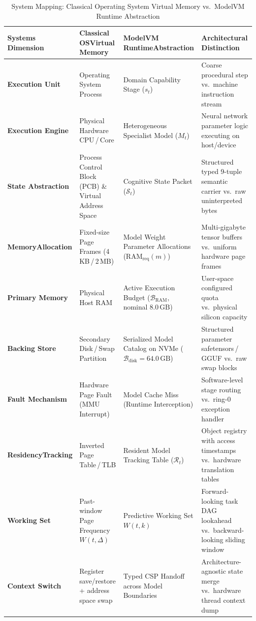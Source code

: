 \begin{table}[t]
\small
\centering
\caption{System Mapping: Classical Operating System Virtual Memory vs.\ ModelVM Runtime Abstraction}
\label{tab:os_analogy}
\setlength{\tabcolsep}{4pt}
\renewcommand{\arraystretch}{1.18}
\begin{tabular}{>{\RaggedRight\bfseries}p{2.85cm} >{\RaggedRight}p{3.55cm} >{\RaggedRight}p{3.78cm} >{\RaggedRight}p{5.20cm}}
\toprule
\textbf{Systems Dimension} & \textbf{Classical OS}\newline\textbf{Virtual Memory} & \textbf{ModelVM Runtime}\newline\textbf{Abstraction} & \textbf{Architectural Distinction} \\
\midrule
Execution Unit & Operating System Process & Domain Capability Stage ($s_t$) & Coarse procedural step vs.\ machine instruction stream \\
\addlinespace[3.5pt]
Execution Engine & Physical Hardware CPU\,/\,Core & Heterogeneous Specialist Model ($M_t$) & Neural network parameter logic executing on host/device \\
\addlinespace[3.5pt]
State Abstraction & Process Control Block (PCB) \& Virtual Address Space & Cognitive State Packet ($\mathcal{S}_t$) & Structured typed 9-tuple semantic carrier vs.\ raw uninterpreted bytes \\
\addlinespace[3.5pt]
Memory\newline Allocation & Fixed-size Page Frames (4\,KB\,/\,2\,MB) & Model Weight Parameter Allocations ($\text{RAM}_{\text{req}}(m)$) & Multi-gigabyte tensor buffers vs.\ uniform hardware page frames \\
\addlinespace[3.5pt]
Primary Memory & Physical Host RAM & Active Execution Budget ($\mathcal{B}_{\text{RAM}}$, nominal $8.0\,\text{GB}$) & User-space configured quota vs.\ physical silicon capacity \\
\addlinespace[3.5pt]
Backing Store & Secondary Disk\,/\,Swap Partition & Serialized Model Catalog on NVMe ($\mathcal{B}_{\text{disk}} = 64.0\,\text{GB}$) & Structured parameter \mbox{safetensors\,/\,GGUF} vs.\ raw swap blocks \\
\addlinespace[3.5pt]
Fault Mechanism & Hardware Page Fault (MMU Interrupt) & Model Cache Miss (Runtime Interception) & Software-level stage routing vs.\ ring-0 exception handler \\
\addlinespace[3.5pt]
Residency\newline Tracking & Inverted Page Table\,/\,TLB & Resident Model Tracking Table ($\mathcal{R}_t$) & Object registry with access timestamps vs.\ hardware translation tables \\
\addlinespace[3.5pt]
Working Set & Past-window Page Frequency $W(t, \Delta)$ & Predictive Working Set $W(t, k)$ & Forward-looking task DAG lookahead vs.\ backward-looking sliding window \\
\addlinespace[3.5pt]
Context Switch & Register save/restore + address space swap & Typed CSP Handoff across Model Boundaries & Architecture-agnostic state merge vs.\ hardware thread context dump \\
\bottomrule
\end{tabular}
\end{table}

